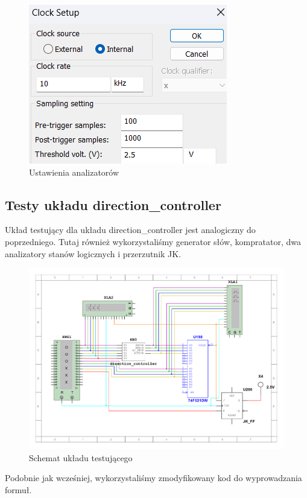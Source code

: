 \documentclass[a4paper]{article}
\begin{document}
\begin{figure}[H]
    \centering
    \includegraphics{direction_controller_test_logic_analizer_settings.png}
    \caption{Ustawienia analizatorów}
\end{figure}

\subsection{Testy układu direction\_controller}
Układ testujący dla układu direction\_controller jest analogiczny do poprzedniego.
Tutaj również wykorzystaliśmy generator słów, kompratator, dwa analizatory stanów logicznych
i przerzutnik JK. 

\begin{figure}[H]
    \centering
    \includegraphics[width=\textwidth]{component_test_direction_controller.pdf}
    \caption{Schemat układu testującego}
\end{figure}

Podobnie jak wcześniej, wykorzystaliśmy zmodyfikowany kod do wyprowadzania formuł.
\end{document}
